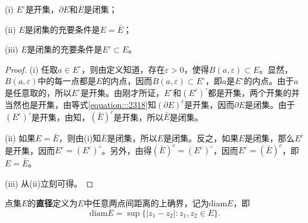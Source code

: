 \documentclass[../../main.tex]{subfiles}
\begin{document}
\begin{proposition}\label{proposition:开集,闭集的充要条件}
(i) \(E^\circ\)是开集，\(\partial E\)和\(\bar{E}\)是闭集；

(ii) \(E\)是闭集的充要条件是\(E = \bar{E}\)；

(iii) \(E\)是闭集的充要条件是\(E' \subset E\)。
\end{proposition}
\begin{proof}
(i) 任取\(a \in E^\circ\)，则由定义知道，存在\(\varepsilon > 0\)，使得\(B(a, \varepsilon) \subset E\)。显然，\(B(a, \varepsilon)\)中的每一点都是\(E\)的内点，因而\(B(a, \varepsilon) \subset E^\circ\)，即\(a\)是\(E^\circ\)的内点。由于\(a\)是任意取的，所以\(E^\circ\)是开集。由刚才所证，\(E^\circ\)和\((E^c)^\circ\)都是开集，两个开集的并当然也是开集，由等式\eqref{equation:::2318}知\((\partial E)^c\)是开集，因而\(\partial E\)是闭集。由于\((E^c)^\circ\)是开集，由知，\((\bar{E})^c\)是开集，所以\(\bar{E}\)是闭集。

(ii) 如果\(E = \bar{E}\)，则由(i)知\(\bar{E}\)是闭集，所以\(E\)是闭集。反之，如果\(E\)是闭集，那么\(E^c\)是开集，因而\(E^c = (E^c)^\circ\)。另外，由得\((\bar{E})^c = (E^c)^\circ\)，因而\(E^c = (\bar{E})^c\)，即\(E = \bar{E}\)。

(iii) 从(ii)立刻可得。 

\end{proof}

\begin{definition}
点集\(E\)的\textbf{直径}定义为\(E\)中任意两点间距离的上确界，记为\(\mathrm{diam}E\)，即
\[
\mathrm{diam}E = \sup\{ | z_1 - z_2 | : z_1, z_2 \in E \}.
\]
\end{definition}
\end{document}
